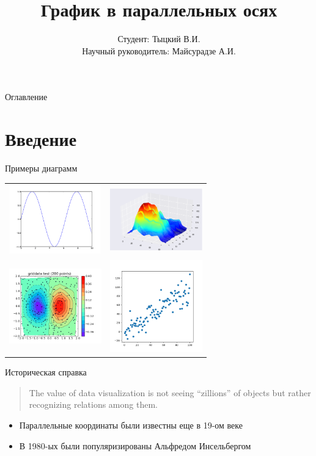 \documentclass[fleqn, xcolor=x11names]{beamer}
\title{\bfseries График в параллельных осях}
\author[Тыцкий В.И.]{Студент: Тыцкий В.И.\\[1ex]  {\small Научный руководитель: Майсурадзе А.И.}}
\institute[ВМК МГУ]{МГУ имени М. В. Ломоносова, факультет ВМК, кафедра ММП}
\date{}
\begin{document}
\begin{frame}
    \titlepage
\end{frame}

 \begin{frame}{Оглавление}
     \tableofcontents
\end{frame}

\section{Введение}

\begin{frame}{Примеры диаграмм}
    \centering
    \begin{tabular}{cc}
        \includegraphics[width=4cm]{example_1.png} &
        \includegraphics[width=4cm]{example_2.png}   \\
        \includegraphics[width=4cm]{example_3.png} &
        \includegraphics[width=4cm]{example_4.png}
    \end{tabular}
\end{frame}

\begin{frame}{Историческая справка}
    \begin{quote}
        The value of data visualization is not seeing “zillions” 
    of objects but rather recognizing relations among them.
    \end{quote}
    \vspace{30px}
    \begin{itemize}
        \item Параллельные координаты были известны еще в 19-ом веке
        \item В 1980-ых были популяризированы Альфредом Инсельбергом
    \end{itemize}
\end{frame}
\end{document}
